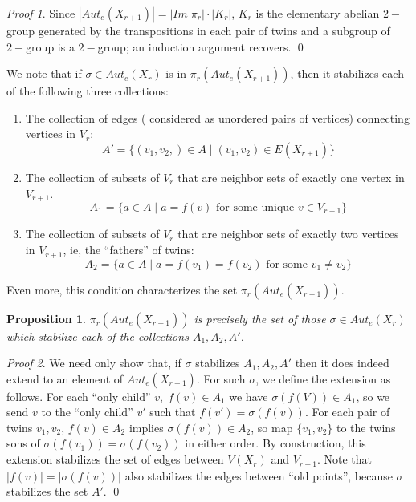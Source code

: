 \documentclass[12pt,a4paper]{book}
\theoremstyle{plain}
\newtheorem{proposition}{Proposition}
\theoremstyle{definition}
\theoremstyle{remark}
\newtheorem*{Proof}{Proof}
\begin{document}
\begin{Proof}
 Since $| Aut_e(X_{r+1}) | = | Im \; \pi_r | \cdot | K_r |$, $K_r$ is the elementary abelian $2-$group generated by the transpositions in 
each pair of twins and a subgroup of $2-$group is a $2-$group; an induction argument recovers.
\qed  \end{Proof}

We note that if $\sigma \in Aut_e(X_r)$ is in $\pi_r(Aut_e(X_{r+1}))$, then it stabilizes each of the following 
three collections:
\begin{enumerate}
 \item The collection of edges ( considered as unordered pairs of vertices) connecting vertices in $V_r$:
\[
 A' = \{ (v_1, v_2, ) \in A \; | \; ( v_1, v_2 ) \in  E(X_{r+1}) \}
\]

 \item The collection of subsets of $V_r$ that are neighbor sets of exactly one vertex in $V_{r+1}$.
\[
 A_1 = \{ a \in A \; | \; a = f(v) \mbox{ for some unique } v \in V_{r+1} \}
\]
 \item The collection of subsets of $V_r$ that are neighbor sets of exactly two vertices in $V_{r+1}$, ie, the ``fathers'' of twins:
\[
 A_2 = \{ a \in A \; | \; a=f(v_1) = f(v_2 ) \mbox{ for some } v_1  \neq v_2 \}
\]

\end{enumerate}

Even more, this condition characterizes the set $\pi_r (Aut_e (X_{r+1}))$.

\begin{proposition}
$\pi_r(Aut_e(X_{r+1}))$ is precisely the set of those $\sigma \in Aut_e (X_r)$ which stabilize each of the collections $A_1, A_2, A'$.
\end{proposition}

\begin{Proof}
 We need only show that, if $\sigma$ stabilizes $A_1, A_2,A'$  then it does indeed extend to an element of $Aut_e(X_{r+1})$. For such $\sigma$, 
we define the extension as follows. For each ``only child'' $v,\; f(v) \in A_1$ we have $\sigma ( f(V)) \in A_1$, so we send  $v$ to the ``only child'' $v'$ 
such that $f(v') = \sigma(f(v))$. For each pair of twins $v_1, v_2$, $f(v) \in A_2$ implies $ \sigma(f(v)) \in A_2$, so map $\{ v_1, v_2 \}$ to the 
twins sons of $\sigma( f(v_1)) = \sigma(f(v_2))$ in either order. By construction, this extension stabilizes the set of edges between $V(X_r)$ and 
$V_{r+1}$. Note that $|f(v)|= |\sigma ( f(v))|$ also stabilizes the edges between ``old points'', because $\sigma$ stabilizes the set $A'$.
\qed  \end{Proof}
\end{document}

